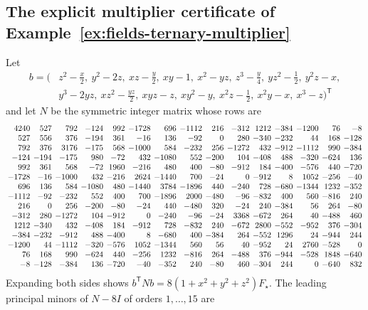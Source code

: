 \subsection{The explicit multiplier certificate of
Example~\ref{ex:fields-ternary-multiplier}}
\label{app:fields-ternary-multiplier}

Let
\[
\begin{aligned}
 b=(&z^2-\tfrac x2,\ y^2-2z,\ xz-\tfrac y2,\ xy-1,\ x^2-yz,\
     z^3-\tfrac y4,\ yz^2-\tfrac12,\ y^2z-x,\\
    &y^3-2yz,\ xz^2-\tfrac{yz}2,\ xyz-z,\ xy^2-y,\ x^2z-\tfrac12,\
     x^2y-x,\ x^3-z)^{\mathsf T}
\end{aligned}
\]
and let $N$ be the symmetric integer matrix whose rows are
{\scriptsize
\[
\setlength{\arraycolsep}{2pt}
\begin{array}{rrrrrrrrrrrrrrr}
4240&527&792&-124&992&-1728&696&-1112&216&-312&1212&-384&-1200&76&-8\\
527&556&376&-194&361&-16&136&-92&0&280&-340&-232&44&168&-128\\
792&376&3176&-175&568&-1000&584&-232&256&-1272&432&-912&-1112&990&-384\\
-124&-194&-175&980&-72&432&-1080&552&-200&104&-408&488&-320&-624&136\\
992&361&568&-72&1960&-216&480&400&-80&-912&184&-400&-576&440&-720\\
-1728&-16&-1000&432&-216&2624&-1440&700&-24&0&-912&8&1052&-256&-40\\
696&136&584&-1080&480&-1440&3784&-1896&440&-240&728&-680&-1344&1232&-352\\
-1112&-92&-232&552&400&700&-1896&2000&-480&-96&-832&400&560&-816&240\\
216&0&256&-200&-80&-24&440&-480&320&-24&240&-384&56&264&-80\\
-312&280&-1272&104&-912&0&-240&-96&-24&3368&-672&264&40&-488&460\\
1212&-340&432&-408&184&-912&728&-832&240&-672&2800&-552&-952&376&-304\\
-384&-232&-912&488&-400&8&-680&400&-384&264&-552&1296&24&-944&244\\
-1200&44&-1112&-320&-576&1052&-1344&560&56&40&-952&24&2760&-528&0\\
76&168&990&-624&440&-256&1232&-816&264&-488&376&-944&-528&1848&-640\\
-8&-128&-384&136&-720&-40&-352&240&-80&460&-304&244&0&-640&832
\end{array}
\]}
Expanding both sides shows $b^{\mathsf T}Nb=8(1+x^2+y^2+z^2)F_\star$. The
leading principal minors of $N-8I$ of orders $1,\ldots,15$ are
